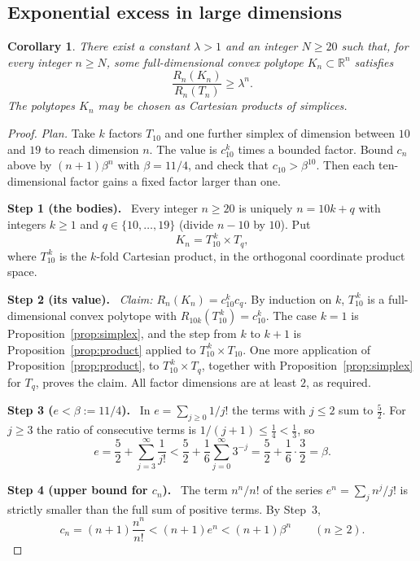 \documentclass[11pt]{article}
\newtheorem{corollary}[theorem]{Corollary}
\newcommand{\R}{\mathbb R}
\newcommand{\step}[1]{\par\smallskip\noindent\textbf{#1}\ }
\begin{document}
\subsection{Exponential excess in large dimensions}

\begin{corollary}\label{cor:exponential-excess}
There exist a constant \(\lambda>1\) and an integer \(N\ge20\) such that, for every
integer \(n\ge N\), some full-dimensional convex polytope
\(K_n\subset\R^n\) satisfies
\[
 \frac{R_n(K_n)}{R_n(T_n)}\ge\lambda^n.
\]
The polytopes \(K_n\) may be chosen as Cartesian products of simplices.
\end{corollary}

\begin{proof}
\emph{Plan.} Take \(k\) factors \(T_{10}\) and one further simplex of
dimension between \(10\) and \(19\) to reach dimension \(n\). The value
is \(c_{10}^k\) times a bounded factor. Bound \(c_n\) above by
\((n+1)\beta^n\) with \(\beta=11/4\), and check that
\(c_{10}>\beta^{10}\). Then each ten-dimensional factor gains a fixed
factor larger than one.

\step{Step 1 (the bodies).} Every integer \(n\ge20\) is uniquely
\(n=10k+q\) with integers \(k\ge1\) and \(q\in\{10,\ldots,19\}\)
(divide \(n-10\) by \(10\)). Put
\[
 K_n=T_{10}^{\,k}\times T_q,
\]
where \(T_{10}^{\,k}\) is the \(k\)-fold Cartesian product, in the
orthogonal coordinate product space.

\step{Step 2 (its value).} \emph{Claim: \(R_n(K_n)=c_{10}^kc_q\).} By
induction on \(k\), \(T_{10}^{\,k}\) is a full-dimensional convex
polytope with \(R_{10k}(T_{10}^{\,k})=c_{10}^k\). The case \(k=1\) is
Proposition~\ref{prop:simplex}, and the step from \(k\) to \(k+1\) is
Proposition~\ref{prop:product} applied to
\(T_{10}^{\,k}\times T_{10}\). One more application of
Proposition~\ref{prop:product}, to \(T_{10}^{\,k}\times T_q\), together
with Proposition~\ref{prop:simplex} for \(T_q\), proves the claim. All
factor dimensions are at least \(2\), as required.

\step{Step 3 (\(e<\beta:=11/4\)).} In \(e=\sum_{j\ge0}1/j!\) the terms
with \(j\le2\) sum to \(\tfrac52\). For \(j\ge3\) the ratio of
consecutive terms is \(1/(j+1)\le\tfrac14<\tfrac13\), so
\[
 e=\frac52+\sum_{j=3}^{\infty}\frac1{j!}
 <\frac52+\frac16\sum_{j=0}^{\infty}3^{-j}
 =\frac52+\frac16\cdot\frac32
 =\beta .
\]

\step{Step 4 (upper bound for \(c_n\)).} The term \(n^n/n!\) of the
series \(e^n=\sum_jn^j/j!\) is strictly smaller than the full sum of
positive terms. By Step~3,
\[
 c_n=(n+1)\frac{n^n}{n!}<(n+1)e^n<(n+1)\beta^n\qquad(n\ge2).
\]


\end{proof}
\end{document}
